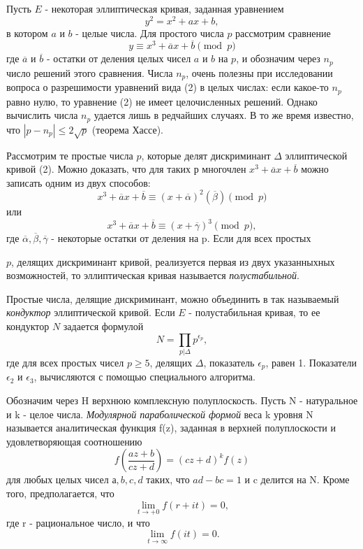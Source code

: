 \documentclass[a4paper]{article}
\begin{document}
\begin{multicols}{3}
Пусть $E$ - некоторая эллиптическая кривая, заданная уравнением \[y^2 = x^2 +ax+b,\] в котором $a$ и $b$ - целые числа. Для простого числа $p$ рассмотрим сравнение 
\begin{equation}
    y \equiv x^3 + \overline a x + \overline b \pmod{p}
\end{equation}
где \(\overline a\) и \(\overline b\) - остатки от деления целых
чисел $a$ и $b$ на $p$, и обозначим через \(n_p\) число решений этого сравнения. Числа  \(n_p\), очень полезны при исследовании вопроса о разрешимости уравнений вида (2) в целых числах: если какое-то \(n_p\) равно нулю, то уравнение (2) не имеет целочисленных решений. Однако вычислить числа  \(n_p\) удается лишь в редчайших случаях.
В то же время известно, что \(|p-n_p| \leq 2\sqrt{p}\) (теорема Хассе).

Рассмотрим те простые числа $p$, которые делят дискриминант \(\Delta\) эллиптической кривой (2). Можно доказать, что для таких р многочлен \(x^3 + \overline a x + \overline b\) можно записать одним из двух способов: \[x^3 + \overline a x + \overline b\equiv(x+\overline\alpha)^2(\overline\beta)\pmod{p}\] или \[x^3 + \overline a x + \overline b\equiv(x+\overline\gamma)^3\pmod{p},\] где \(\overline\alpha, \overline\beta, \overline\gamma\) - некоторые остатки от деления на p. Если для всех простых 

\columnbreak\noindent $p$, делящих дискриминант кривой, реализуется первая из двух указанныхных возможностей, то эллиптическая кривая называется \textit{полустабильной}.

Простые числа, делящие дискриминант, можно объединить в так называемый \textit{кондуктор} эллиптической кривой. Если $E$ - полустабильная кривая, то ее кондуктор $N$ задается формулой
\begin{equation}
    N = \prod_{p|\Delta}p^{\epsilon_p},
\end{equation}
где для всех простых чисел \(p \geq 5\), делящих \(\Delta\), показатель \(\epsilon_p\), равен 1. Показатели \(\epsilon_2\) и \(\epsilon_3\), вычисляются с помощью специального алгоритма.
\begin{center}
    \parbox{0.85\linewidth}{\centering\large\bfseries{}}
\end{center}
Обозначим через H верхнюю комплексную полуплоскость. Пусть N - натуральное и k - целое числа. \textit{Модулярной параболической формой} веса k уровня N называется аналитическая функция f(z), заданная в верхней полуплоскости и удовлетворяющая соотношению
\begin{equation}
    f(\frac{az+b}{cz+d}) = (cz+d)^k f(z)
\end{equation}
для любых целых чисел $а, b, c, d$ таких, что \(ad - bc = 1\) и c делится на N. Кроме того, предполагается, что \[\lim\limits_{t \to +0}f(r+it)=0,\] где r - рациональное число, и что \[\lim\limits_{t \to \infty}f(it)=0.\]


\end{multicols}
\end{document}
